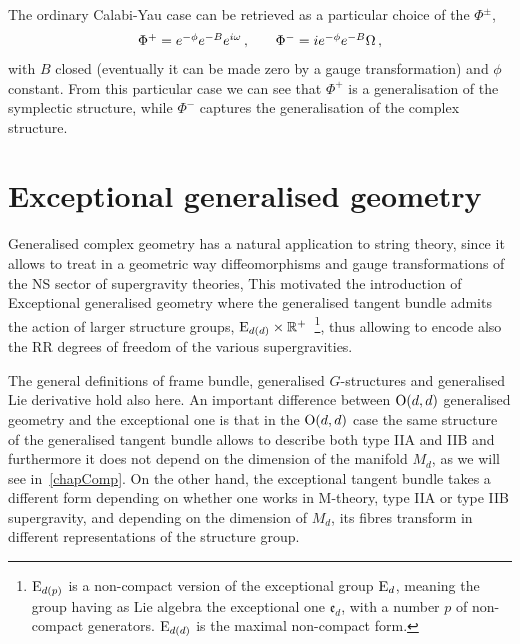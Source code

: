 \documentclass[debug]{phd}
\begin{document}
				
%				
				
								
				The ordinary Calabi-Yau case can be retrieved as a particular choice of the $\Phi^{\pm}$, 
						\begin{equation}
							\begin{array}{l c c r}
								\Phi^+ = e^{-\phi} e^{-B} e^{i\omega} \, , & & \Phi^- = i e^{-\phi} e^{-B} \Omega \, ,
							\end{array}
						\end{equation}
				with $B$ closed (eventually it can be made zero by a gauge transformation) and $\phi$ constant.
				From this particular case we can see that $\Phi^+$ is a generalisation of the symplectic structure, while $\Phi^-$ captures the generalisation of the complex structure.
				
		\section{Exceptional generalised geometry}
Generalised complex geometry has a natural application to string theory, since it allows to treat in a geometric way diffeomorphisms and gauge transformations of the NS sector of supergravity theories, This motivated the introduction of 
			Exceptional generalised geometry where the generalised tangent bundle admits the action of larger structure groups, $\mathrm{E}_{d(d)} \times \mathbb{R}^+$~\cite{hull1, waldram5, waldram2}\footnote{%
				$\mathrm{E}_{d(p)}$ is a non-compact version of the exceptional group $\mathrm{E}_d$, meaning the group having as Lie algebra the exceptional one $\mathfrak{e}_d$, with a number $p$ of non-compact generators.
				$\mathrm{E}_{d(d)}$ is the maximal non-compact form.}, thus allowing to encode also the RR degrees of freedom of the various supergravities.
			
			The general definitions of frame bundle, generalised $G$-structures and generalised Lie derivative hold also here.
			An important difference between $\mathrm{O}(d, d)$ generalised geometry and the exceptional one is that in the $\mathrm{O}(d,d)$ case the same structure of the generalised tangent bundle allows to describe both type IIA and IIB and furthermore it does not depend on the dimension of the manifold $M_d$, as we will see in~\cref{chapComp}. 
			On the other hand, the exceptional tangent bundle takes a different form depending on whether one works in M-theory, type IIA or type IIB supergravity, and depending on the dimension of $M_d$, its fibres transform in different representations of the structure group.
			
\end{document}
